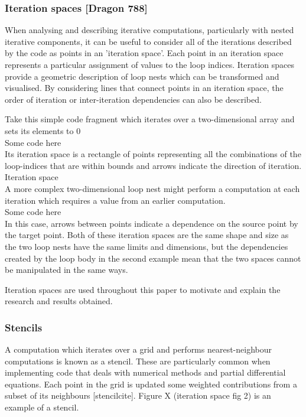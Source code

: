 \documentclass[a4paper,12pt,twoside]{report}
\begin{document}
\subsubsection{Iteration spaces [Dragon 788]}
When analysing and describing iterative computations, particularly with nested iterative components, it can be useful to consider 
all of the iterations described by the code as points in an 'iteration space'. Each point in an iteration space represents a
particular assignment of values to the loop indices. Iteration spaces provide a geometric description of loop nests which can be
transformed and visualised. By considering lines that connect points in an iteration space, the order of iteration or 
inter-iteration dependencies can also be described.

Take this simple code fragment which iterates over a two-dimensional array and sets its elements to 0
\\ Some code here \\
Its iteration space is a rectangle of points representing all the combinations of the loop-indices that are within bounds and
arrows indicate the direction of iteration.
\\ Iteration space \\

A more complex two-dimensional loop nest might perform a computation at each iteration which requires a value from an earlier
computation.
\\ Some code here \\
In this case, arrows between points indicate a dependence on the source point by the target point. Both of these iteration 
spaces are the same shape and size as the two loop nests have the same limits and dimensions, but the
dependencies created by the loop body in the second example mean that the two spaces cannot be manipulated in the same ways.

Iteration spaces are used throughout this paper to motivate and explain the research and results obtained.

\subsubsection{Stencils}
A computation which iterates over a grid and performs nearest-neighbour computations is known as a stencil. These are
particularly common when implementing code that deals with numerical methods and partial differential equations.
Each point in the grid is updated some weighted contributions from a subset of its neighbours [stencilcite]. Figure X (iteration
space fig 2) is an example of a stencil.
\end{document}
